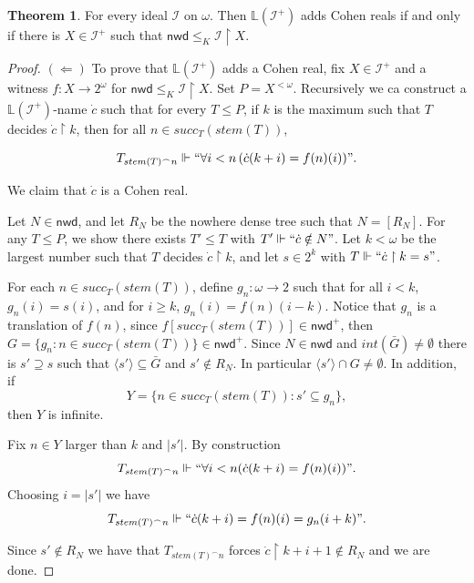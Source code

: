 \documentclass{amsart}
\theoremstyle{definition}
\newtheorem{theorem}{Theorem}[section]
\theoremstyle{remark}
\numberwithin{equation}{section}
\newcommand{\nwd}{\mathsf{nwd}}
\newcommand{\li}{\mathbb{L}(\mathcal{I}^+)}
\newcommand{\id}{\mathcal{I}}
\newcommand{\restr}[2]{#1\upharpoonright {#2}}
\begin{document}
\begin{theorem} \label{Cohen reals}
    For every ideal $\id$ on $\omega$. Then $\li$ adds Cohen reals if and only if there is $X\in\id^+$ such that $\nwd \leq_K \restr{\id}{X}$.
\end{theorem}
\begin{proof}
$(\Leftarrow)$ To prove that $\li$ adds a Cohen real, fix $X \in \id^+$ and a witness $f: X \to 2^\omega$ for $\nwd \leq_K \id \upharpoonright X$. Set $P = X^{<\omega}$. Recursively we ca construct a $\li$-name $\dot c$ such that for every $T \leq P$, if $k$ is the maximum such that $T$ decides $\dot c \upharpoonright k$, then for all $n\in succ_T(stem(T))$,

\begin{displaymath}
    T_{stem(T)^\frown n}\Vdash `` \forall i<n \, ( \dot c(k+i)=f(n)(i))".
\end{displaymath}
    
We claim that $\dot c$ is a Cohen real.

Let $N \in \nwd$, and let $R_N$ be the nowhere dense tree such that $N = [R_N]$. For any $T \leq P$, we show there exists $T' \leq T$ with $T' \Vdash ``\dot c \notin N"$. Let $k < \omega$ be the largest number such that $T$ decides $\dot c \upharpoonright k$, and let $s \in 2^k$ with $T \Vdash ``\dot c \upharpoonright k = s"$.

For each $n \in succ_T(stem(T))$, define $g_n : \omega \to 2$ such that for all $i<k$, $g_n(i)=s(i)$, and for $i \geq k$, $g_n(i)=f(n)(i-k)$. Notice that $g_n$ is a translation of $f(n)$, since $f[succ_T(stem(T))]\in \nwd^+$, then $G=\{g_n:n\in succ_T(stem(T))\}\in \nwd^+$. Since $N\in \nwd$ and $int(\bar{G})\not=\emptyset$ there is $s'\supseteq s$ such that $\langle s'\rangle\subseteq \bar G$ and $s'\notin R_N$. In particular $\langle s'\rangle\cap G\not=\emptyset$. In addition, if \[Y=\{n\in succ_T(stem(T)):s'\subseteq g_n\},\] then $Y$ is infinite.

Fix $n\in Y$ larger than $k$ and $|s'|$. By construction
\begin{displaymath}
    T_{stem(T)^\frown n}\Vdash``\forall i<n (\dot c(k+i)=f(n)(i))".
\end{displaymath}
Choosing $i=|s'|$ we have
\begin{displaymath}
    T_{stem(T)^\frown n}\Vdash``\dot c(k+i)=f(n)(i)=g_n(i+k)".
\end{displaymath}

Since $s'\notin R_N$ we have that $T_{stem(T)^\frown n}$ forces $\dot c\upharpoonright k+i+1\not\in R_N$ and we are done.


\end{proof}
\end{document}
